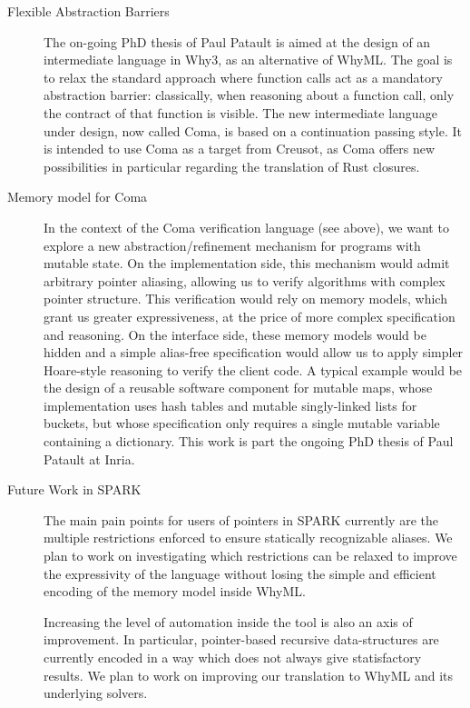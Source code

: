 \documentclass[a4paper,11pt]{article}
\begin{document}
\begin{description}
\item[Flexible Abstraction Barriers]

  The on-going PhD thesis of Paul Patault is aimed at the design of an
  intermediate language in Why3, as an alternative of WhyML. The goal is to
  relax the standard approach where function calls act as a mandatory abstraction
  barrier: classically, when reasoning about a function call, only the contract
  of that function is visible. The new intermediate language under design, now
  called Coma, is based on a continuation passing style. It is intended to use
  Coma as a target from Creusot, as Coma offers new possibilities in particular
  regarding the translation of Rust closures.

\item[Memory model for Coma]

  In the context of the Coma verification language (see above),
  we want to explore a new abstraction/refinement mechanism for
  programs with mutable state.
  On the implementation side, this mechanism would admit arbitrary
  pointer aliasing, allowing us to verify algorithms with complex
  pointer structure.
  This verification would rely on memory models, which grant us
  greater expressiveness, at the price of more complex specification
  and reasoning.
  On the interface side, these memory models would be hidden and a
  simple alias-free specification would allow us to apply simpler
  Hoare-style reasoning to verify the client code.
  A typical example would be the design of a reusable software component for
  mutable maps, whose implementation uses hash tables and mutable singly-linked
  lists for buckets, but whose specification only requires a single mutable
  variable containing a dictionary.
  This work is part the ongoing PhD thesis of Paul Patault at Inria.

\item[Future Work in SPARK]

  The main pain points for users of pointers in SPARK currently are the multiple
  restrictions enforced to ensure statically recognizable aliases. We plan to work on
  investigating which restrictions can be relaxed to improve the expressivity of
  the language without losing the simple and efficient encoding of the memory
  model inside WhyML.

  Increasing the level of automation inside the tool is also an axis of improvement.
  In particular, pointer-based recursive data-structures are currently encoded in a
  way which does not always give statisfactory results. We plan to work on improving
  our translation to WhyML and its underlying solvers.


\end{description}
\end{document}
